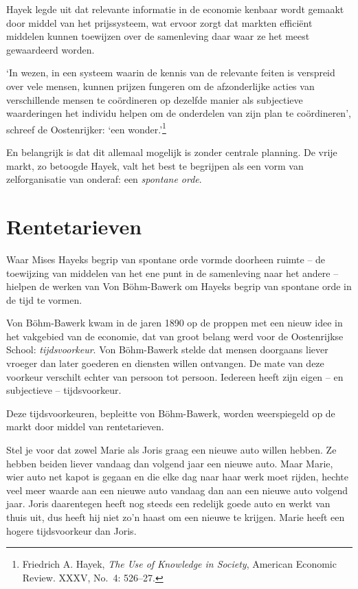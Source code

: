 \documentclass[
  a5paper,
  smalldemyvopaper,11pt,twoside,onecolumn,openright,extrafontsizes,
hidelinks]{memoir}
\begin{document}
Hayek legde uit dat relevante informatie in de economie kenbaar wordt
gemaakt door middel van het prijssysteem, wat ervoor zorgt dat markten
efficiënt middelen kunnen toewijzen over de samenleving daar waar ze het
meest gewaardeerd worden.

`In wezen, in een systeem waarin de kennis van de relevante feiten is
verspreid over vele mensen, kunnen prijzen fungeren om de afzonderlijke
acties van verschillende mensen te coördineren op dezelfde manier als
subjectieve waarderingen het individu helpen om de onderdelen van zijn
plan te coördineren', schreef de Oostenrijker: `een wonder.'\footnote{Friedrich
  A. Hayek, \emph{The Use of Knowledge in Society}, American Economic
  Review. XXXV, No.~4: 526--27.}

En belangrijk is dat dit allemaal mogelijk is zonder centrale planning.
De vrije markt, zo betoogde Hayek, valt het best te begrijpen als een
vorm van zelforganisatie van onderaf: een \emph{spontane orde}.

\section{Rentetarieven}\label{rentetarieven}

Waar Mises Hayeks begrip van spontane orde vormde doorheen ruimte -- de
toewijzing van middelen van het ene punt in de samenleving naar het
andere -- hielpen de werken van Von Böhm-Bawerk om Hayeks begrip van
spontane orde in de tijd te vormen.

Von Böhm-Bawerk kwam in de jaren 1890 op de proppen met een nieuw idee
in het vakgebied van de economie, dat van groot belang werd voor de
Oostenrijkse School: \emph{tijdsvoorkeur}. Von Böhm-Bawerk stelde dat
mensen doorgaans liever vroeger dan later goederen en diensten willen
ontvangen. De mate van deze voorkeur verschilt echter van persoon tot
persoon. Iedereen heeft zijn eigen -- en subjectieve -- tijdsvoorkeur.

Deze tijdsvoorkeuren, bepleitte von Böhm-Bawerk, worden weerspiegeld op
de markt door middel van rentetarieven.

Stel je voor dat zowel Marie als Joris graag een nieuwe auto willen
hebben. Ze hebben beiden liever vandaag dan volgend jaar een nieuwe
auto. Maar Marie, wier auto net kapot is gegaan en die elke dag naar
haar werk moet rijden, hechte veel meer waarde aan een nieuwe auto
vandaag dan aan een nieuwe auto volgend jaar. Joris daarentegen heeft
nog steeds een redelijk goede auto en werkt van thuis uit, dus heeft hij
niet zo'n haast om een nieuwe te krijgen. Marie heeft een hogere
tijdsvoorkeur dan Joris.
\end{document}
